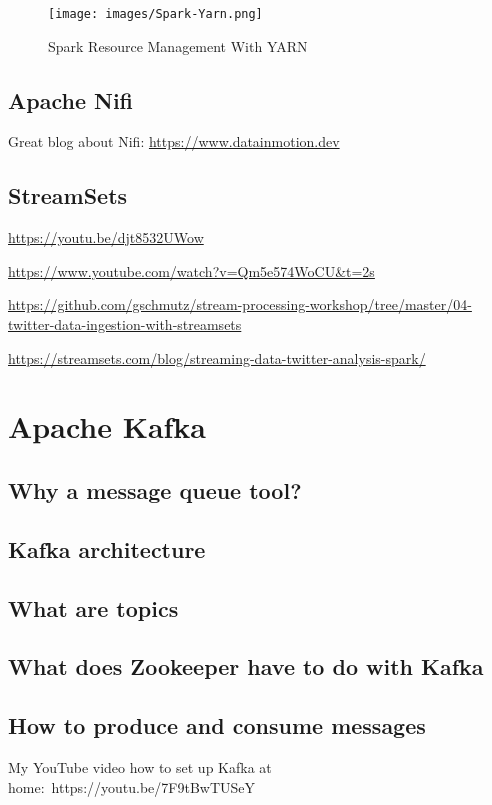 \documentclass[12pt, numbers=noenddot]{scrreprt} %
\begin{document}
\begin{figure}[htbp]
  \centering
     \texttt{[image: images/Spark-Yarn.png]}
  \caption{Spark Resource Management With YARN}
  \label{fig:Bild1}
\end{figure}


\section{Apache Nifi}
Great blog about Nifi:
\url{https://www.datainmotion.dev}

\section{StreamSets}

\url{https://youtu.be/djt8532UWow}

\url{https://www.youtube.com/watch?v=Qm5e574WoCU&t=2s}

\url{https://github.com/gschmutz/stream-processing-workshop/tree/master/04-twitter-data-ingestion-with-streamsets}

\url{https://streamsets.com/blog/streaming-data-twitter-analysis-spark/}

\chapter{Apache Kafka}

\section{Why a message queue tool?}
\section{Kafka architecture}
\section{What are topics}
\section{What does Zookeeper have to do with Kafka}
\section{How to produce and consume messages}

My YouTube video how to set up Kafka at home: https://youtu.be/7F9tBwTUSeY
\end{document}
